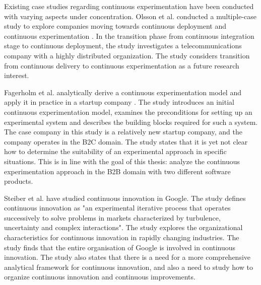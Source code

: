 \documentclass[english]{tktltiki2}
\theoremstyle{definition}
\theoremstyle{remark}
\begin{document}

Existing case studies regarding continuous experimentation have been conducted with varying aspects under concentration. Olsson et al. conducted a multiple-case study to explore companies moving towards continuous deployment and continuous experimentation \cite{olsson2012climbing}. In the transition phase from continuous integration stage to continuous deployment, the study investigates a telecommunications company with a highly distributed organization. The study considers transition from continuous delivery to continuous experimentation as a future research interest. 

Fagerholm et al. analytically derive a continuous experimentation model and apply it in practice in a startup company \cite{fagerholm2014building}. The study introduces an initial continuous experimentation model, examines the preconditions for setting up an experimental system and describes the building blocks required for such a system. The case company in this study is a relatively new startup company, and the company operates in the B2C domain. The study states that it is yet not clear how to determine the suitability of an experimental approach in specific situations. This is in line with the goal of this thesis: analyze the continuous experimentation approach in the B2B domain with two different software products.

Steiber et al. \cite{steiber2013corporate} have studied continuous innovation in Google. The study defines continuous innovation as "an experimental iterative process that operates successively to solve problems in markets characterized by turbulence, uncertainty and complex interactions". The study explores the organizational characteristics for continuous innovation in rapidly changing industries. The study finds that the entire organisation of Google is involved in continuous innovation. The study also states that there is a need for a more comprehensive analytical framework for continuous innovation, and also a need to study how to organize continuous innovation and continuous improvements.   
\end{document}
